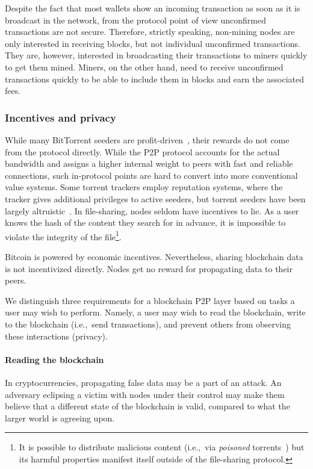 Despite the fact that most wallets show an incoming transaction as soon as it is broadcast in the network, from the protocol point of view unconfirmed transactions are not secure.
Therefore, strictly speaking, non-mining nodes are only interested in receiving blocks, but not individual unconfirmed transactions.
They are, however, interested in broadcasting their transactions to miners quickly to get them mined.
Miners, on the other hand, need to receive unconfirmed transactions quickly to be able to include them in blocks and earn the associated fees.



\subsubsection{Incentives and privacy}

While many BitTorrent seeders are profit-driven~\cite{Rumin2010}, their rewards do not come from the protocol directly.
While the P2P protocol accounts for the actual bandwidth and assigns a higher internal weight to peers with fast and reliable connections, such in-protocol points are hard to convert into more conventional value systems.
Some torrent trackers employ reputation systems, where the tracker gives additional privileges to active seeders, but torrent seeders have been largely altruistic~\cite{Rehn2004}.
In file-sharing, nodes seldom have incentives to lie.
As a user knows the hash of the content they search for in advance, it is impossible to violate the integrity of the file\footnote{It is possible to distribute malicious content (i.e.,~via \textit{poisoned} torrents~\cite{Lou2006}) but its harmful properties manifest itself outside of the file-sharing protocol.}.


Bitcoin is powered by economic incentives.
Nevertheless, sharing blockchain data is not incentivized directly.
Nodes get no reward for propagating data to their peers.

We distinguish three requirements for a blockchain P2P layer based on tasks a user may wish to perform.
Namely, a user may wish to read the blockchain, write to the blockchain (i.e.,~send transactions), and prevent others from observing these interactions (privacy).

\paragraph{Reading the blockchain}
In cryptocurrencies, propagating false data may be a part of an attack.
An adversary eclipsing a victim with nodes under their control may make them believe that a different state of the blockchain is valid, compared to what the larger world is agreeing upon.

